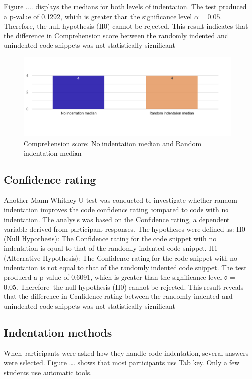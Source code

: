 Figure .... displays the medians for both levels of indentation.
The test produced a p-value of 0.1292, which is greater than the significance level \(\alpha = 0.05\). Therefore, the null hypothesis (H0) cannot be rejected. This result indicates that the difference in Comprehension score between the randomly indented and unindented code snippets was not statistically significant.


\begin{figure} [H]
  \centering
  \includegraphics[scale=0.4]{figures/0-r-q3.png}
  \caption{Comprehension score:  No indentation median and Random indentation median}
  \label{fig:AnhangsChor}
\end{figure}




\subsection{Confidence rating}

Another Mann-Whitney U test was conducted to investigate whether random indentation improves the code confidence rating compared to code with no indentation. The analysis was based on the Confidence rating, a dependent variable derived from participant responses. The hypotheses were defined as: H0 (Null Hypothesis): The Confidence rating for the code snippet with no indentation is equal to that of the randomly indented code snippet. H1 (Alternative Hypothesis): The Confidence rating for the code snippet with no indentation is not equal to that of the randomly indented code snippet.
The test produced a p-value of 0.6091, which is greater than the significance level α = 0.05. Therefore, the null hypothesis (H0) cannot be rejected. This result reveals that the difference in Confidence rating between the randomly indented and unindented code snippets was not statistically significant.  



\subsection{Indentation methods}
When participants were asked how they handle code indentation, several answers were selected. Figure …. shows that most participants use Tab key. Only a few students use automatic tools.  

